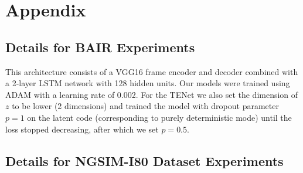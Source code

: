 \documentclass{article}
\newcommand{\modelname}{TENet }
\begin{document}
%
%
%
%
%
%





\section{Appendix}

\subsection{Details for BAIR Experiments}
\label{bair-details}

This architecture consists of a VGG16 frame encoder and decoder combined with a 2-layer LSTM network with 128 hidden units.
Our models were trained using ADAM \citep{ADAM} with a learning rate of 0.002.
For the \modelname we also set the dimension of $z$ to be lower (2 dimensions) and trained the model with dropout parameter $p=1$ on the latent code (corresponding to purely deterministic mode) until the loss stopped decreasing, after which we set $p=0.5$.




\subsection{Details for NGSIM-I80 Dataset Experiments}
\end{document}
